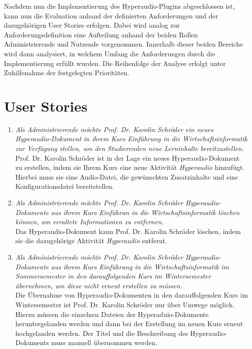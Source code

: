 \label{cap:evaluation}
Nachdem nun die Implementierung des Hyperaudio-Plugins abgeschlossen ist, kann nun die Evaluation anhand der definierten Anforderungen und der dazugehörigen User Stories erfolgen. Dabei wird analog zur Anforderungsdefinition eine Aufteilung anhand der beiden Rollen Administrierende und Nutzende vorgenommen. Innerhalb dieser beiden Bereiche wird dann analysiert, in welchem Umfang die Anforderungen durch die Implementierung erfüllt wurden. Die Reihenfolge der Analyse erfolgt unter Zuhilfenahme der festgelegten Prioritäten.

\section{User Stories}
\begin{enumerate}[label=US-\arabic*:,ref=US-\arabic*]

\item \label{US-Admin-Erstellen-Eval} \textit{Als Administrierende möchte Prof. Dr. Karolin Schröder ein neues Hyperaudio-Dokument in ihrem Kurs \glqq Einführung in die Wirtschaftsinformatik\grqq{} zur Verfügung stellen, um den Studierenden neue Lerninhalte bereitzustellen.}\\
Prof. Dr. Karolin Schröder ist in der Lage ein neues Hyperaudio-Dokument zu erstellen, indem sie Ihrem Kurs eine neue Aktivität \textit{Hyperaudio} hinzufügt. Hierbei muss sie eine Audio-Datei, die gewünschten Zusatzinhalte und eine Konfigurationsdatei bereitstellen.


\item \label{US-Admin-Loeschen-Eval} \textit{Als Administrierende möchte Prof. Dr. Karolin Schröder Hyperaudio-Dokumente aus ihrem Kurs \glqq Einführun in die Wirtschaftsinformatik\grqq{} löschen können, um veraltete Informationen zu entfernen.}\\
Das Hyperaudio-Dokument kann Prof. Dr. Karolin Schröder löschen, indem sie die dazugehörige Aktivität \textit{Hyperaudio} entfernt.

\item \label{US-Admin-Semester-Eval} \textit{Als Administrierende möchte Prof. Dr. Karolin Schröder Hyperaudio-Dokumente aus ihrem Kurs \glqq Einführung in die Wirtschaftsinformatik\grqq{} im Sommersemester in den darauffolgenden Kurs im Wintersemester übernehmen, um diese nicht erneut erstellen zu müssen.}\\
Die Übernahme von Hyperaudio-Dokumenten in den darauffolgenden Kurs im Wintersemester ist Prof. Dr. Karolin Schröder nur über Umwege möglich. Hierzu müssen die einzelnen Dateien der Hyperaduio-Dokumente heruntergelanden werden und dann bei der Erstellung im neuen Kurs erneut hochgelanden werden. Der Titel und die Beschreibung des Hyperaudio-Dokuments muss manuell übernommen werden.


\end{enumerate}
